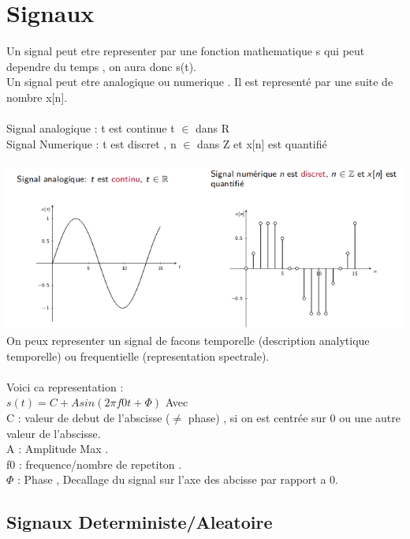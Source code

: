 \documentclass[a4paper,8pt,openany]{book}
\begin{document}
\chapter{Signaux}
Un signal peut etre representer par une fonction mathematique s qui peut dependre du temps , on aura donc s(t).\\
Un signal peut etre analogique ou numerique . Il est representé par une suite de nombre x[n].\\
\\
Signal analogique : t est continue t $\in$ dans R \\
Signal Numerique : t est discret , n $\in$ dans Z et x[n] est quantifié \\
\\
\includegraphics[width=1\textwidth,center]{img/signaux_anal_num.png}
\\
On peux representer un signal de facons temporelle (description analytique temporelle) ou frequentielle (representation spectrale).\\
\\
Voici ca representation  : \\
$s(t) = C + A sin(2\pi f0 t + \Phi )$  Avec \\
C : valeur de debut de l'abscisse ($\neq$ phase) , si on est centrée sur 0 ou une autre valeur de l'abscisse.\\
A : Amplitude Max .\\
f0 : frequence/nombre de repetiton .\\
$\Phi$ : Phase , Decallage du signal sur l'axe des abcisse par rapport a 0.\\

\section{Signaux Deterministe/Aleatoire}
\end{document}

